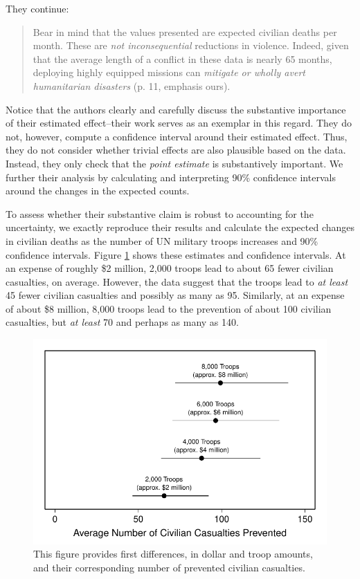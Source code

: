 \documentclass[12pt]{article}
\begin{document}
\noindent They continue:

\begin{quote}
Bear in mind that the values presented are expected civilian deaths per month. These are \emph{not inconsequential} reductions in violence. Indeed, given that the average length of a conflict in these data is nearly 65 months, deploying highly equipped missions can \emph{mitigate or wholly avert humanitarian disasters} (p. 11, emphasis ours).
\end{quote}

Notice that the authors clearly and carefully discuss the substantive importance of their estimated effect--their work serves as an exemplar in this regard. They do not, however, compute a confidence interval around their estimated effect. Thus, they do not consider whether trivial effects are also plausible based on the data. Instead, they only check that the \emph{point estimate} is substantively important. We further their analysis by calculating and interpreting 90\% confidence intervals around the changes in the expected counts.

To assess whether their substantive claim is robust to accounting for the uncertainty, we exactly reproduce their results and calculate the expected changes in civilian deaths as the number of UN military troops increases and 90\% confidence intervals. Figure \ref{fig:hks-ci} shows these estimates and confidence intervals. At an expense of roughly \$2 million, 2,000 troops lead to about 65 fewer civilian casualties, on average. However, the data suggest that the troops lead to \textit{at least} 45 fewer civilian casualties and possibly as many as 95. Similarly, at an expense of about \$8 million, 8,000 troops lead to the prevention of about 100 civilian casualties, but \emph{at least} 70 and perhaps as many as 140. 

\begin{figure}[H]
\begin{center}
\includegraphics[scale = .8]{figs/hks-ci.pdf}
\caption{This figure provides first differences, in dollar and troop amounts, and their corresponding number of prevented civilian casualties.}\label{fig:hks-ci}
\end{center}
\end{figure}
\end{document}

